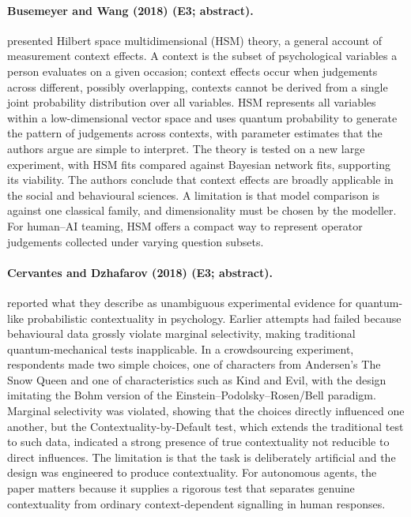 \documentclass[10pt,a4paper]{article}
\begin{document}
\paragraph{Busemeyer and Wang (2018) (E3; abstract).} \citet{Busemeyer2018} presented Hilbert space multidimensional (HSM) theory, a general account of measurement context effects. A context is the subset of psychological variables a person evaluates on a given occasion; context effects occur when judgements across different, possibly overlapping, contexts cannot be derived from a single joint probability distribution over all variables. HSM represents all variables within a low-dimensional vector space and uses quantum probability to generate the pattern of judgements across contexts, with parameter estimates that the authors argue are simple to interpret. The theory is tested on a new large experiment, with HSM fits compared against Bayesian network fits, supporting its viability. The authors conclude that context effects are broadly applicable in the social and behavioural sciences. A limitation is that model comparison is against one classical family, and dimensionality must be chosen by the modeller. For human--AI teaming, HSM offers a compact way to represent operator judgements collected under varying question subsets.

\paragraph{Cervantes and Dzhafarov (2018) (E3; abstract).} \citet{Cervantes2018} reported what they describe as unambiguous experimental evidence for quantum-like probabilistic contextuality in psychology. Earlier attempts had failed because behavioural data grossly violate marginal selectivity, making traditional quantum-mechanical tests inapplicable. In a crowdsourcing experiment, respondents made two simple choices, one of characters from Andersen's The Snow Queen and one of characteristics such as Kind and Evil, with the design imitating the Bohm version of the Einstein--Podolsky--Rosen/Bell paradigm. Marginal selectivity was violated, showing that the choices directly influenced one another, but the Contextuality-by-Default test, which extends the traditional test to such data, indicated a strong presence of true contextuality not reducible to direct influences. The limitation is that the task is deliberately artificial and the design was engineered to produce contextuality. For autonomous agents, the paper matters because it supplies a rigorous test that separates genuine contextuality from ordinary context-dependent signalling in human responses.
\end{document}
